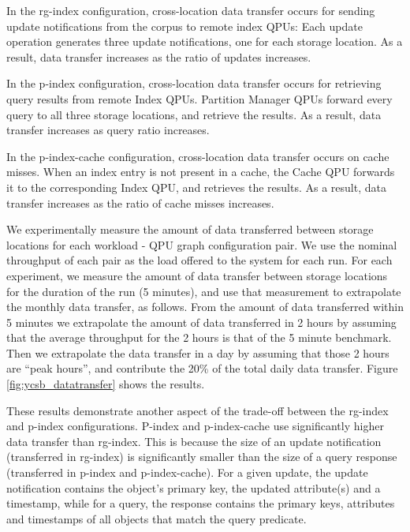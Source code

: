 In the rg-index configuration, cross-location data transfer occurs for sending update notifications from the corpus
to remote index QPUs:
Each update operation generates three update notifications, one for each storage location.
As a result, data transfer increases as the ratio of updates increases.

In the p-index configuration, cross-location data transfer occurs for retrieving query results from remote Index QPUs.
Partition Manager QPUs forward every query to all three storage locations, and retrieve the results.
As a result, data transfer increases as query ratio increases.

In the p-index-cache configuration, cross-location data transfer occurs on cache misses.
When an index entry is not present in a cache, the Cache QPU forwards it to the corresponding Index QPU, and retrieves the
results.
As a result, data transfer increases as the ratio of cache misses increases.

\bigskip
\noindent
We experimentally measure the amount of data transferred between storage locations for each workload - QPU graph configuration
pair.
We use the nominal throughput of each pair as the load offered to the system for each run.
For each experiment, we measure the amount of data transfer between storage locations for the duration of the run (5 minutes),
and use that measurement to extrapolate the monthly data transfer, as follows.
From the amount of data transferred within 5 minutes we extrapolate the amount of data transferred in 2 hours by assuming
that the average throughput for the 2 hours is that of the 5 minute benchmark.
Then we extrapolate the data transfer in a day by assuming that those 2 hours are ``peak hours'',
and contribute the 20\% of the total daily data transfer.
Figure \ref{fig:ycsb_datatransfer} shows the results.

These results demonstrate another aspect of the trade-off between the rg-index and p-index configurations.
P-index and p-index-cache use significantly higher data transfer than rg-index.
This is because the size of an update notification (transferred in rg-index)
is significantly smaller than the size of a query response (transferred in p-index and p-index-cache).
For a given update, the update notification contains the object's primary key, the updated attribute(s) and a timestamp,
while for a query, the response contains the primary keys, attributes and timestamps of all objects that match the query predicate.

